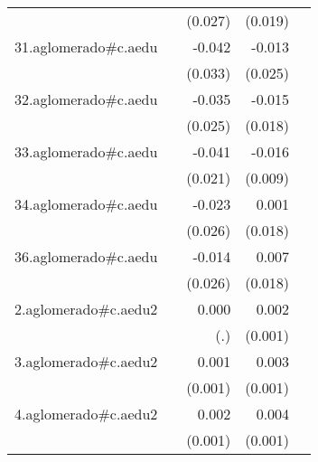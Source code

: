 {\begin{longtable}{l*{4}{D{.}{.}{-1}}}
            &                     &     (0.027)         &     (0.019)         &                     \\
\addlinespace
31.aglomerado#c.aedu&                     &      -0.042         &      -0.013         &                     \\
            &                     &     (0.033)         &     (0.025)         &                     \\
\addlinespace
32.aglomerado#c.aedu&                     &      -0.035         &      -0.015         &                     \\
            &                     &     (0.025)         &     (0.018)         &                     \\
\addlinespace
33.aglomerado#c.aedu&                     &      -0.041\sym{*}  &      -0.016         &                     \\
            &                     &     (0.021)         &     (0.009)         &                     \\
\addlinespace
34.aglomerado#c.aedu&                     &      -0.023         &       0.001         &                     \\
            &                     &     (0.026)         &     (0.018)         &                     \\
\addlinespace
36.aglomerado#c.aedu&                     &      -0.014         &       0.007         &                     \\
            &                     &     (0.026)         &     (0.018)         &                     \\
\addlinespace
2.aglomerado#c.aedu2&                     &       0.000         &       0.002\sym{*}  &                     \\
            &                     &         (.)         &     (0.001)         &                     \\
\addlinespace
3.aglomerado#c.aedu2&                     &       0.001         &       0.003\sym{**} &                     \\
            &                     &     (0.001)         &     (0.001)         &                     \\
\addlinespace
4.aglomerado#c.aedu2&                     &       0.002\sym{*}  &       0.004\sym{***}&                     \\
            &                     &     (0.001)         &     (0.001)         &                     \\

\end{longtable}}
